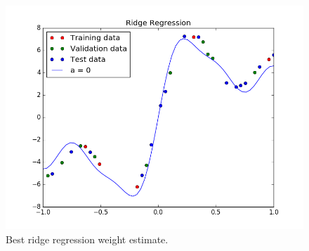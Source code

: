 \documentclass[a4paper,twoside]{article}
\begin{document}
\begin{figure}[b!]
  \includegraphics[width=\linewidth]{../Figures/P4/ridge_best.png}
  \caption{Best ridge regression weight estimate.}
  \label{fig:ridge_best}
\end{figure}

\vfill
\end{document}
